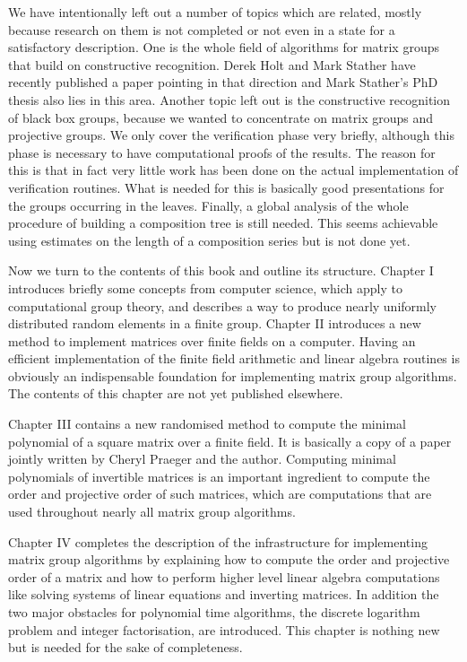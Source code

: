 \documentclass[11pt]{article}
\begin{document}
We have intentionally left out a number of topics which are related,
mostly because research on them is not completed or not even in a state
for a satisfactory description. One is the whole field of algorithms
for matrix groups that build on constructive recognition. Derek Holt
and Mark Stather have recently published a paper pointing in that
direction and Mark Stather’s PhD thesis also lies in this area.
Another topic left out is the constructive recognition of black box
groups, because we wanted to concentrate on matrix groups and projective
groups. We only cover the verification phase very briefly, although
this phase is necessary to have computational proofs of the results.
The reason for this is that in fact very little work has been done on
the actual implementation of verification routines. What is needed for
this is basically good presentations for the groups occurring in the
leaves. Finally, a global analysis of the whole procedure of building a
composition tree is still needed. This seems achievable using estimates
on the length of a composition series but is not done yet.

Now we turn to the contents of this book and outline its structure.
Chapter I introduces briefly some concepts from computer science, which
apply to computational group theory, and describes a way to produce
nearly uniformly distributed random elements in a finite group. Chapter
II introduces a new method to implement matrices over finite fields
on a computer. Having an efficient implementation of the finite field
arithmetic and linear algebra routines is obviously an indispensable
foundation for implementing matrix group algorithms. The contents of
this chapter are not yet published elsewhere.

Chapter III contains a new randomised method to compute the minimal
polynomial of a square matrix over a finite field. It is basically
a copy of a paper jointly written by Cheryl Praeger and the author.
Computing minimal polynomials of invertible matrices is an important
ingredient to compute the order and projective order of such matrices,
which are computations that are used throughout nearly all matrix group
algorithms.

Chapter IV completes the description of the infrastructure for
implementing matrix group algorithms by explaining how to compute the
order and projective order of a matrix and how to perform higher level
linear algebra computations like solving systems of linear equations
and inverting matrices. In addition the two major obstacles for
polynomial time algorithms, the discrete logarithm problem and integer
factorisation, are introduced. This chapter is nothing new but is needed
for the sake of completeness.
\end{document}
